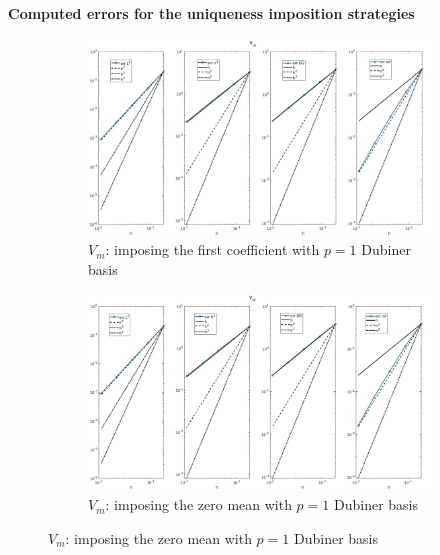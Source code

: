 \documentclass[a4paper,11pt]{article}
\begin{document}
\begin{center}
\textbf{Computed errors for the uniqueness imposition strategies}
\end{center}
\begin{figure}[H]
\caption{Comparison of the trans-membrane potential ($V_m$)}
\label{Vm-unique}
\begin{subfigure}{\textwidth}
\begin{center}
\includegraphics[width = \textwidth]{./errors/D1_Vm_1.jpg}
\caption{$V_m$: imposing the first coefficient with $p=1$ Dubiner basis}
\end{center}
\end{subfigure}
\begin{subfigure}{\textwidth}
\begin{center}
\includegraphics[width =\textwidth]{./errors/D1_Vm_2.jpg}
\caption{$V_m$: imposing the zero mean with $p=1$ Dubiner basis}
\end{center}
\end{subfigure}
\end{figure}
\end{document}
